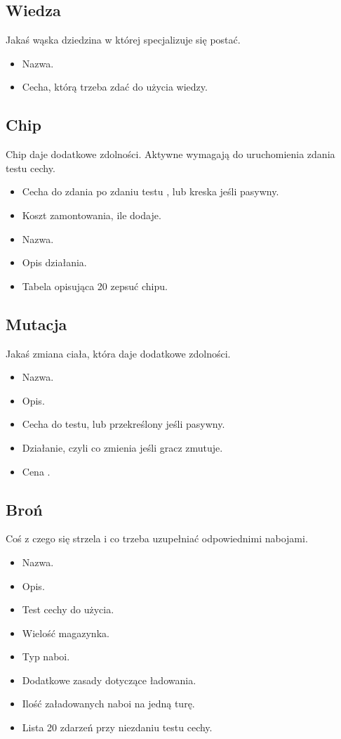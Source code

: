 \subsection{Wiedza}
Jakaś wąska dziedzina w której specjalizuje się postać.
\begin{itemize}
 \item Nazwa.
 \item Cecha, którą trzeba zdać do użycia wiedzy.
\end{itemize}

\subsection{Chip}
Chip daje dodatkowe zdolności.
Aktywne wymagają do uruchomienia zdania testu cechy.
\begin{itemize}
 \item Cecha do zdania po zdaniu testu \abnkp{}, lub kreska jeśli pasywny.
 \item Koszt zamontowania, ile \abnkp{} dodaje.
 \item Nazwa.
 \item Opis działania.
 \item Tabela opisująca 20 zepsuć chipu.
\end{itemize}

\subsection{Mutacja}
Jakaś zmiana ciała, która daje dodatkowe zdolności.
\begin{itemize}
 \item Nazwa.
 \item Opis.
 \item Cecha do testu, lub przekreślony jeśli pasywny.
 \item Działanie, czyli co zmienia jeśli gracz zmutuje.
 \item Cena \abnkp{}. 
\end{itemize}

\subsection{Broń}
Coś z czego się strzela i co trzeba uzupełniać odpowiednimi nabojami.
\begin{itemize}
 \item Nazwa.
 \item Opis.
 \item Test cechy do użycia.
 \item Wielość magazynka.
 \item Typ naboi.
 \item Dodatkowe zasady dotyczące ładowania.
 \item Ilość załadowanych naboi na jedną turę.
 \item Lista 20 zdarzeń przy niezdaniu testu cechy.
\end{itemize}











